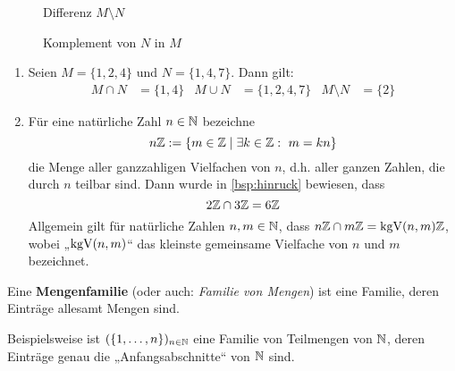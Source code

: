 \begin{de}
\begin{figure}[ht]
\begin{minipage}{.48\textwidth}
            \caption{Differenz $M\setminus N$}
        \end{minipage}
        \quad
        \begin{minipage}{.48\textwidth}
            \centering
            \caption{Komplement von $N$ in $M$}
        \end{minipage}
    \end{figure}
\end{de}


\begin{bsp} \quad
    \begin{enumerate}
        \item Seien $ M = \{1, 2, 4\}$ und $N = \{1, 4, 7\}$. Dann gilt: 
	\begin{align*}
            M \cap N &= \{1, 4\} & M \cup N &= \{1, 2, 4, 7\} & M \setminus N &= \{2\}
	\end{align*}
        \item Für eine natürliche Zahl $n\in \mathbb N$ bezeichne
            \[ n\mathbb Z := \{ m\in \mathbb Z \mid \exists k\in \mathbb Z:\ m=kn \} \]
        die Menge aller ganzzahligen Vielfachen von $n$, d.h. aller ganzen Zahlen, die durch $n$ teilbar sind. Dann wurde in \cref{bsp:hinruck} bewiesen, dass
            \[ 2\mathbb Z \cap 3\mathbb Z = 6\mathbb Z \]
        Allgemein gilt für natürliche Zahlen $n,m\in \mathbb N$, dass $n\mathbb Z\cap m\mathbb Z = \operatorname{kgV}(n,m)\mathbb Z$, wobei „$\operatorname{kgV}(n,m)$“ das kleinste gemeinsame Vielfache von $n$ und $m$ bezeichnet.
    \end{enumerate}
\end{bsp}


\begin{de}[Mengenfamilie] 
    Eine \textbf{Mengenfamilie} (oder auch: \emph{Familie von Mengen}) ist eine Familie, deren Einträge allesamt Mengen sind.
\end{de}


\begin{bsp}
    Beispielsweise ist $(\{1,\dots , n\})_{n\in \mathbb N}$ eine Familie von Teilmengen von $\mathbb N$, deren Einträge genau die „Anfangsabschnitte“ von $\mathbb N$ sind.
\end{bsp}


